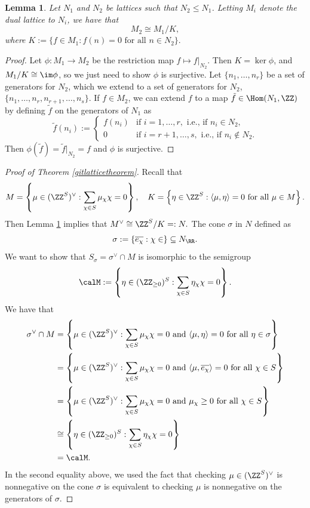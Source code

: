 \documentclass[12pt]{amsart}
\theoremstyle{plain}
\newtheorem{lemma}[theorem]{Lemma}
\begin{document}
\begin{lemma}\label{duallatticesublattice}
Let $N_1$ and $N_2$ be lattices such that $N_2 \le N_1$.
Letting $M_i$ denote the dual lattice to $N_i$, we have that
$$M_2 \cong M_1 / K,$$
where $K:= \{f \in M_1 : f(n) = 0 \text{ for all } n \in N_2\}.$
\end{lemma}
\begin{proof}
Let $\phi : M_1 \to M_2$ be the restriction map $f \mapsto \left. f \right|_{N_2}$.
Then $K = \ker \phi$, and $M_1 / K \cong \im \phi$, so we just need to show $\phi$ is surjective.
Let $\{n_1, \ldots, n_r\}$ be a set of generators for $N_2$, which we extend to a set of generators for $N_2$, $\{n_1, \ldots, n_r, n_{r+1}, \ldots, n_s\}$.
If $f \in M_2$, we can extend $f$ to a map $\tilde f \in \Hom(N_1, \ZZ)$ by defining $\tilde f$ on the generators of $N_1$ as
$$\tilde f(n_i) := \begin{cases} f(n_i) & \text{if } i = 1, \ldots, r, \text{ i.e., if } n_i \in N_2, \\ 0 & \text{if } i = r+1, \ldots, s, \text{ i.e., if } n_i \notin N_2. \end{cases}$$
Then $\phi(\tilde f) = \tilde f \big|_{N_2} = f$ and $\phi$ is surjective.
\end{proof}

\begin{proof}[{Proof of Theorem \ref{gitlatticetheorem}}]
Recall that 
$$M = \left\{\mu \in (\ZZ^S)^\vee : \sum_{\chi \in S} \mu_\chi \chi = 0 \right\}, \quad K = \left\{\eta \in \ZZ^S : \langle \mu, \eta \rangle = 0 \text{ for all } \mu \in M\right\}.$$
Then Lemma \ref{duallatticesublattice} implies that $M^\vee \cong \ZZ^S / K =: N.$
The cone $\sigma$ in $N$ defined as 
$$\sigma := \{\overline{e_\chi} : \chi \in \} \subseteq N_\RR.$$
We want to show that $S_\sigma = \sigma^\vee \cap M$ is isomorphic to the semigroup
$$\calM := \left\{ \eta \in (\ZZ_{\ge 0})^S : \sum_{\chi \in S} \eta_\chi \chi = 0\right\}.$$
We have that
\begin{align*}
	\sigma^\vee \cap M &= \left\{\mu \in (\ZZ^S)^\vee : \sum_{\chi \in S} \mu_\chi \chi = 0 \text{ and } \langle \mu, \eta \rangle = 0 \text{ for all } \eta \in \sigma \right\}\\
	&= \left\{\mu \in (\ZZ^S)^\vee : \sum_{\chi \in S} \mu_\chi \chi = 0 \text{ and } \langle \mu, \overline{e_\chi} \rangle = 0 \text{ for all } \chi \in S \right\}\\
	&= \left\{\mu \in (\ZZ^S)^\vee : \sum_{\chi \in S} \mu_\chi \chi = 0 \text{ and } \mu_\chi \ge 0 \text{ for all } \chi \in S \right\}\\
	&\cong  \left\{ \eta \in (\ZZ_{\ge 0})^S : \sum_{\chi \in S} \eta_\chi \chi = 0\right\} \\
	&=\calM.
\end{align*}
In the second equality above, we used the fact that checking $\mu \in (\ZZ^S)^\vee$ is nonnegative on the cone $\sigma$ is equivalent to checking $\mu$ is nonnegative on the generators of $\sigma$.
\end{proof}
\end{document}
